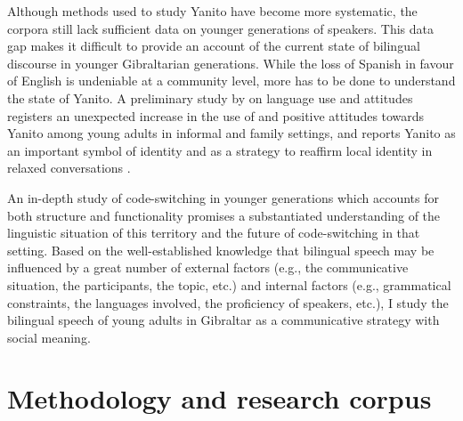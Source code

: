 \documentclass[output=paper]{langscibook}
\begin{document}
Although methods used to study Yanito have become more systematic, the corpora still lack sufficient data on younger generations of speakers. This data gap makes it difficult to provide an account of the current state of bilingual discourse in younger Gibraltarian generations. While the loss of Spanish in favour of English is undeniable at a community level, more has to be done to understand the state of Yanito. A preliminary study by
\citet{chevasco_contemporary_2019} on language use and attitudes registers an unexpected increase in the use of and positive attitudes towards Yanito among young adults in informal and family settings, and reports Yanito as an important symbol of identity and as a strategy to reaffirm local identity in relaxed conversations \citep[63]{chevasco_contemporary_2019}. 

An in-depth study of code-switching in younger generations which accounts for both structure and functionality promises a substantiated understanding of the linguistic situation of this territory and the future of code-switching in that setting. Based on the well-established knowledge that bilingual speech may be influenced by a great number of external factors (e.g., the communicative situation, the participants, the topic, etc.) and internal factors (e.g., grammatical constraints, the languages involved, the proficiency of speakers, etc.), I study the bilingual speech of young adults in Gibraltar as a communicative strategy with social meaning.

\section{Methodology and research corpus}\label{RG:sec:03}
\end{document}
